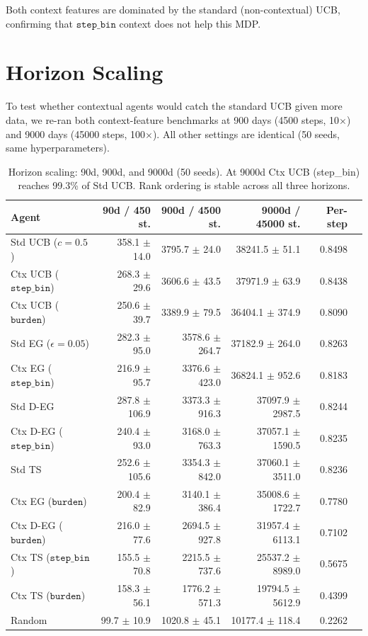 \documentclass[11pt]{article}
\begin{document}
Both context features are dominated by the standard (non-contextual) UCB, confirming that $\texttt{step\_bin}$ context does not help this MDP.

\section{Horizon Scaling}

To test whether contextual agents would catch the standard UCB given more data, we re-ran both context-feature benchmarks at 900 days (4500 steps, 10$\times$) and 9000 days (45000 steps, 100$\times$). All other settings are identical (50 seeds, same hyperparameters).

\begin{table}[h]
\centering
\begin{tabular}{lrrrrr}
\toprule
Agent & 90d / 450 st. & 900d / 4500 st. & 9000d / 45000 st. & Per-step \\
\midrule
Std UCB ($c=0.5$) & 358.1 $\pm$ 14.0 & 3795.7 $\pm$ 24.0 & 38241.5 $\pm$ 51.1 & 0.8498 \\
Ctx UCB ($\texttt{step\_bin}$) & 268.3 $\pm$ 29.6 & 3606.6 $\pm$ 43.5 & 37971.9 $\pm$ 63.9 & 0.8438 \\
Ctx UCB ($\texttt{burden}$) & 250.6 $\pm$ 39.7 & 3389.9 $\pm$ 79.5 & 36404.1 $\pm$ 374.9 & 0.8090 \\
Std EG ($\epsilon=0.05$) & 282.3 $\pm$ 95.0 & 3578.6 $\pm$ 264.7 & 37182.9 $\pm$ 264.0 & 0.8263 \\
Ctx EG ($\texttt{step\_bin}$) & 216.9 $\pm$ 95.7 & 3376.6 $\pm$ 423.0 & 36824.1 $\pm$ 952.6 & 0.8183 \\
Std D-EG & 287.8 $\pm$ 106.9 & 3373.3 $\pm$ 916.3 & 37097.9 $\pm$ 2987.5 & 0.8244 \\
Ctx D-EG ($\texttt{step\_bin}$) & 240.4 $\pm$ 93.0 & 3168.0 $\pm$ 763.3 & 37057.1 $\pm$ 1590.5 & 0.8235 \\
Std TS & 252.6 $\pm$ 105.6 & 3354.3 $\pm$ 842.0 & 37060.1 $\pm$ 3511.0 & 0.8236 \\
Ctx EG ($\texttt{burden}$) & 200.4 $\pm$ 82.9 & 3140.1 $\pm$ 386.4 & 35008.6 $\pm$ 1722.7 & 0.7780 \\
Ctx D-EG ($\texttt{burden}$) & 216.0 $\pm$ 77.6 & 2694.5 $\pm$ 927.8 & 31957.4 $\pm$ 6113.1 & 0.7102 \\
Ctx TS ($\texttt{step\_bin}$) & 155.5 $\pm$ 70.8 & 2215.5 $\pm$ 737.6 & 25537.2 $\pm$ 8989.0 & 0.5675 \\
Ctx TS ($\texttt{burden}$) & 158.3 $\pm$ 56.1 & 1776.2 $\pm$ 571.3 & 19794.5 $\pm$ 5612.9 & 0.4399 \\
\midrule
Random & 99.7 $\pm$ 10.9 & 1020.8 $\pm$ 45.1 & 10177.4 $\pm$ 118.4 & 0.2262 \\
\bottomrule
\end{tabular}
\caption{Horizon scaling: 90d, 900d, and 9000d (50 seeds). At 9000d Ctx UCB (step\_bin) reaches 99.3\% of Std UCB. Rank ordering is stable across all three horizons.}
\end{table}
\end{document}
